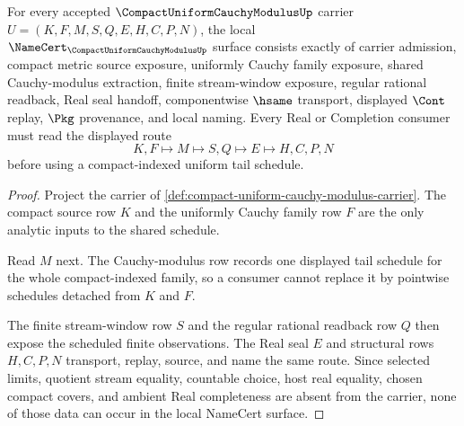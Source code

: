 \begin{theorem}\label{thm:compact-uniform-cauchy-modulus-namecert-obligations}
For every accepted $\CompactUniformCauchyModulusUp$ carrier $U=(K,F,M,S,Q,E,H,C,P,N)$, the local $\NameCert_{\CompactUniformCauchyModulusUp}$ surface consists exactly of carrier admission, compact metric source exposure, uniformly Cauchy family exposure, shared Cauchy-modulus extraction, finite stream-window exposure, regular rational readback, Real seal handoff, componentwise $\hsame$ transport, displayed $\Cont$ replay, $\Pkg$ provenance, and local naming. Every Real or Completion consumer must read the displayed route
$$
K,F \longmapsto M \longmapsto S,Q \longmapsto E \longmapsto H,C,P,N
$$
before using a compact-indexed uniform tail schedule.
\end{theorem}
\begin{proof}
Project the carrier of \autoref{def:compact-uniform-cauchy-modulus-carrier}. The compact source row $K$ and the uniformly Cauchy family row $F$ are the only analytic inputs to the shared schedule.

Read $M$ next. The Cauchy-modulus row records one displayed tail schedule for the whole compact-indexed family, so a consumer cannot replace it by pointwise schedules detached from $K$ and $F$.

The finite stream-window row $S$ and the regular rational readback row $Q$ then expose the scheduled finite observations. The Real seal $E$ and structural rows $H,C,P,N$ transport, replay, source, and name the same route. Since selected limits, quotient stream equality, countable choice, host real equality, chosen compact covers, and ambient Real completeness are absent from the carrier, none of those data can occur in the local NameCert surface.
\end{proof}

